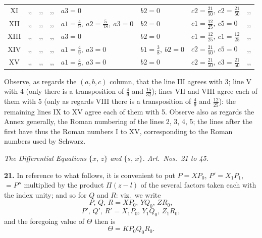 \documentclass[11pt]{article}
\newcommand{\artno}[1]{\textbf{#1.}\quad}
\begin{document}
{\begin{tabular}{|c|l|l|l|l|c|}
XI    & ,,\ \ ,,\ \ ,,                                            & $a3 = 0$ & $b2 = 0$ & $c2 = \tfrac{21}{50},\ c2 = \tfrac{21}{50}$ & ,, \\
XII   & ,,\ \ ,,\ \ ,,                                            & $a1 = \tfrac{4}{9},\ a2 = \tfrac{5}{18},\ a3 = 0$ & $b2 = 0$ & $c1 = \tfrac{12}{25},\ c5 = 0$ & ,, \\
XIII  & ,,\ \ ,,\ \ ,,                                            & $a3 = 0$ & $b2 = 0$ & $c1 = \tfrac{12}{25},\ c1 = \tfrac{12}{25}$ & ,, \\
XIV   & ,,\ \ ,,\ \ ,,                                            & $a1 = \tfrac{4}{9},\ a3 = 0$ & $b1 = \tfrac{3}{8},\ b2 = 0$ & $c2 = \tfrac{21}{50},\ c5 = 0$ & ,, \\
XV    & ,,\ \ ,,\ \ ,,                                            & $a1 = \tfrac{4}{9},\ a3 = 0$ & $b2 = 0$ & $c2 = \tfrac{21}{50},\ c3 = \tfrac{21}{50}$ & ,, \\
\hline
\end{tabular}%
}

\medskip
\noindent\small * Observe, as regards the $(a, b, c)$ column, that the line III agrees with 3; line V with 4 (only there is a transposition of $\tfrac{4}{9}$ and $\tfrac{15}{32}$); lines VII and VIII agree each of them with 5 (only as regards VIII there is a transposition of $\tfrac{4}{9}$ and $\tfrac{12}{25}$): the remaining lines IX to XV agree each of them with 5. Observe also as regards the Annex generally, the Roman numbering of the lines 2, 3, 4, 5; the lines after the first have thus the Roman numbers I to XV, corresponding to the Roman numbers used by Schwarz.\normalsize

\newpage
\begin{center}
\textit{The Differential Equations $\{x,\,z\}$ and $\{s,\,x\}$. Art.\ Nos.\ 21 to 45.}
\end{center}

\medskip

\artno{21} In reference to what follows, it is convenient to put $P = XP_{0}$, $P' = X_{1}P_{1}$,
$= P''$ multiplied by the product $\Pi(z-l)$ of the several factors taken each with the index
unity; and so for $Q$ and $R$: viz.\ we write
\[
   P,\, Q,\, R = XP_{0},\, YQ_{0},\, ZR_{0},
\]
\[
   P',\, Q',\, R' = X_{1}P_{0},\, Y_{1}Q_{0},\, Z_{1}R_{0},
\]
and the foregoing value of $\Theta$ then is
\[
   \Theta = KP_{0}Q_{0}R_{0}.
\]
\end{document}
